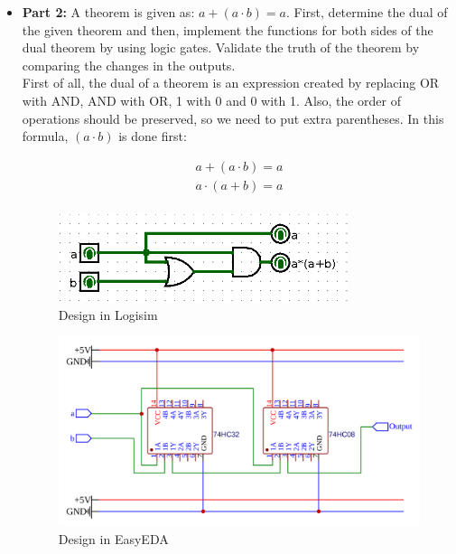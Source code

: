 \documentclass[pdftex,12pt,a4paper]{article}
\begin{document}
\begin{itemize}
\begin{figure}[H]
   \end{figure}
\end{itemize}
\begin{itemize}
    \item \textbf{Part 2:} A theorem is given as: $a + (a \cdot b) = a$. First, determine the dual of the given theorem and then, implement the functions for both sides of the dual theorem by using logic gates. Validate the truth of the theorem by comparing the changes in the outputs. \\
    
    First of all, the dual of a theorem is an expression created by replacing OR with AND, AND with OR, 1 with 0 and 0 with 1. Also, the order of operations should be preserved, so we need to put extra parentheses. In this formula, $(a \cdot b)$ is done first:
    
\begin{align*}
a + (a \cdot b) = a \tag{Original} \\
a \cdot (a+b) = a \tag{Dual} \\
\end{align*}

\begin{figure}[H]
\centering
\includegraphics[width=0.8\textwidth]{Logisim_part_2.png}	
\caption{Design in Logisim}
\end{figure}

\begin{figure}[H]
\centering
\includegraphics[width=\textwidth]{EasyEDA_part_2.png}	
\caption{Design in EasyEDA}
\end{figure}


\end{itemize}
\end{document}
